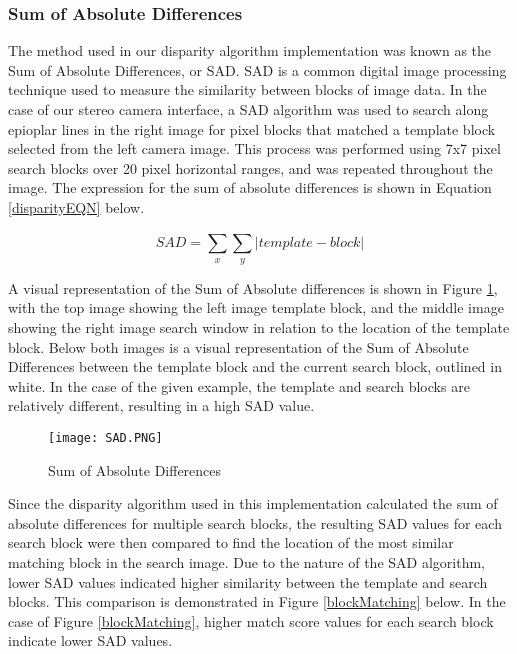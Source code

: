 \subsubsection{Sum of Absolute Differences} \label{SADexample}
The method used in our disparity algorithm implementation was known as the Sum of Absolute Differences, or SAD. SAD is a common digital image processing technique used to measure the similarity between blocks of image data. In the case of our stereo camera interface, a SAD algorithm was used to search along epioplar lines in the right image for pixel blocks that matched a template block selected from the left camera image. This process was performed using 7x7 pixel search blocks over 20 pixel horizontal ranges, and was repeated throughout the image. The expression for the sum of absolute differences is shown in Equation \ref{disparityEQN} below. 
\par
\begin{equation}\label{disparityEQN}
SAD = \sum_{x}^{}\sum_{y}^{}|template-block|
\end{equation}
\par
A visual representation of the Sum of Absolute differences is shown in Figure \ref{SAD}, with the top image showing the left image template block, and the middle image showing the right image search window in relation to the location of the template block. Below both images is a visual representation of the Sum of Absolute Differences between the template block and the current search block, outlined in white. In the case of the given example, the template and search blocks are relatively different, resulting in a high SAD value. 
\par
\begin{figure}[h]
	\centerline{\texttt{[image: SAD.PNG]}}
	\caption{Sum of Absolute Differences \cite{mccormick}}
	\label{SAD}
\end{figure}
\par
Since the disparity algorithm used in this implementation calculated the sum of absolute differences for multiple search blocks, the resulting SAD values for each search block were then compared to find the location of the most similar matching block in the search image. Due to the nature of the SAD algorithm, lower SAD values indicated higher similarity between the template and search blocks. This comparison is demonstrated in Figure \ref{blockMatching} below. In the case of Figure 
\ref{blockMatching}, higher match score values for each search block indicate lower SAD values.
